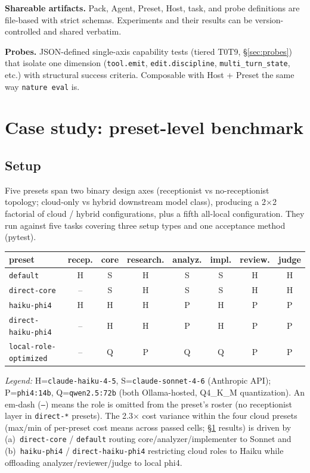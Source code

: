 \documentclass[11pt,a4paper]{article}
\begin{document}
\textbf{Shareable artifacts.} Pack, Agent, Preset, Host, task,
and probe definitions are file-based with strict schemas.
Experiments and their results can be version-controlled and
shared verbatim.

\textbf{Probes.} JSON-defined single-axis capability tests
(tiered T0\textendash T9, \S\ref{sec:probes}) that isolate one
dimension (\texttt{tool.emit}, \texttt{edit.discipline},
\texttt{multi\_turn\_state}, etc.) with structural success
criteria. Composable with Host + Preset the same way
\texttt{nature eval} is.

\section{Case study: preset-level benchmark}
\label{sec:preset-benchmark}

\subsection{Setup}

Five presets span two binary design axes (receptionist vs
no-receptionist topology; cloud-only vs hybrid downstream
model class), producing a 2$\times$2 factorial of cloud / hybrid
configurations, plus a fifth all-local configuration. They run
against five tasks covering three setup types and one
acceptance method (pytest).

\begin{table}[H]
\centering\small
\begin{tabular}{l c c c c c c c}
\toprule
preset & recep. & core & research. & analyz. & impl. & review. & judge \\
\midrule
\texttt{default}              & H & S & H & S & S & H & H \\
\texttt{direct-core}          & -- & S & H & S & S & H & H \\
\texttt{haiku-phi4}           & H & H & H & P & H & P & P \\
\texttt{direct-haiku-phi4}    & -- & H & H & P & H & P & P \\
\texttt{local-role-optimized} & -- & Q & P & Q & Q & P & P \\
\bottomrule
\end{tabular}
\end{table}

\textit{Legend:} H=\texttt{claude-haiku-4-5}, S=\texttt{claude-sonnet-4-6}
(Anthropic API); P=\texttt{phi4:14b}, Q=\texttt{qwen2.5:72b}
(both Ollama-hosted, Q4\_K\_M quantization). An em-dash (\texttt{--})
means the role is omitted from the preset's roster (no receptionist
layer in \texttt{direct-*} presets). The 2.3$\times$ cost variance
within the four cloud presets (max/min of per-preset cost means
across passed cells; \S\ref{sec:preset-benchmark} results) is
driven by (a)~\texttt{direct-core} / \texttt{default} routing
core/analyzer/implementer to Sonnet and (b)~\texttt{haiku-phi4} /
\texttt{direct-haiku-phi4} restricting cloud roles to Haiku while
offloading analyzer/reviewer/judge to local phi4.
\end{document}
